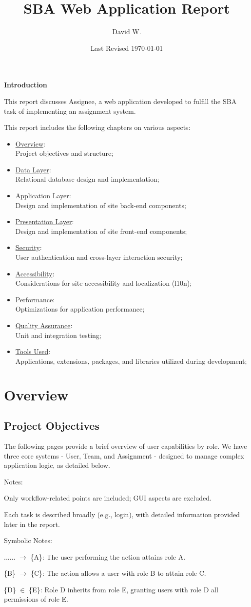 \documentclass[12pt]{report}
\title{SBA Web Application Report}
\author{David W.}
\date{Last Revised \today}
\newcommand{\n}{\par}
\newcommand{\br}{\vspace{1 em}\n}
\begin{document}
\maketitle

\textbf{Introduction}
\br
This report discusses Assignee, a web application developed to fulfill the SBA task of implementing an assignment system.
\br
This report includes the following chapters on various aspects:
\begin{itemize}
	\item \hyperref[overview]{Overview}:\\
	      Project objectives and structure;
	\item \hyperref[data-layer]{Data Layer}:\\
	      Relational database design and implementation;
	\item \hyperref[application-layer]{Application Layer}:\\
	      Design and implementation of site back-end components;
	\item \hyperref[presentation-layer]{Presentation Layer}:\\
	      Design and implementation of site front-end components;
	\item \hyperref[security]{Security}:\\
	      User authentication and cross-layer interaction security;
	\item \hyperref[accessibility]{Accessibility}:\\
	      Considerations for site accessibility and localization (l10n);
	\item \hyperref[performance]{Performance}:\\
	      Optimizations for application performance;
	\item \hyperref[quality-assurance]{Quality Assurance}:\\
	      Unit and integration testing;
	\item \hyperref[tools-used]{Tools Used}:\\
	      Applications, extensions, packages, and libraries utilized during development;
\end{itemize}
\tableofcontents

\chapter{Overview} \label{overview}
\section{Project Objectives} \label{overview.project-objectives}
The following pages provide a brief overview of user capabilities by role.
We have three core systems - User, Team, and Assignment - designed to manage complex application logic, as detailed below.
\br
Notes:\n
Only workflow-related points are included; GUI aspects are excluded.\n
Each task is described broadly (e.g., login), with detailed information provided later in the report.
\br
Symbolic Notes:\n
...... $\rightarrow$ \{A\}: The user performing the action attains role A.\n
\{B\} $\rightarrow$ \{C\}: The action allows a user with role B to attain role C.\n
\{D\} $\in$ \{E\}: Role D inherits from role E, granting users with role D all permissions of role E.
\end{document}
